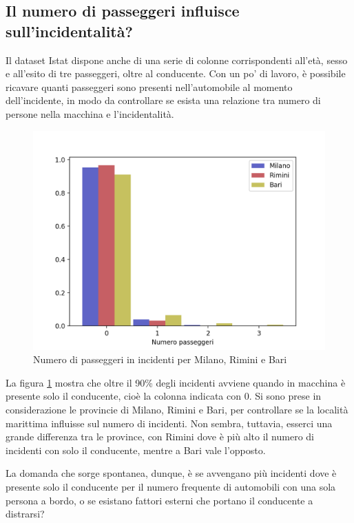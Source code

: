\documentclass[a4paper,12pt]{report}
\begin{document}
\subsection{Il numero di passeggeri influisce sull'incidentalità?}

Il dataset Istat dispone anche di una serie di colonne corrispondenti all'età, sesso e 
all'esito di tre passeggeri, oltre al conducente.
Con un po' di lavoro, è possibile ricavare quanti passeggeri sono presenti 
nell'automobile al momento dell'incidente, in modo da controllare se esista una 
relazione tra numero di persone nella macchina e l'incidentalità.

\begin{figure}
    \includegraphics[width=\linewidth]{../src/incidenti/incidenti_senza_coords/passeggeri/passeggeri.png}
    \caption{Numero di passeggeri in incidenti per Milano, Rimini e Bari}
    \label{fig:passeggeri-milano-rimini}
\end{figure}

La figura \ref{fig:passeggeri-milano-rimini} mostra che oltre il 90\% degli incidenti
avviene quando in macchina è presente solo il conducente, cioè la colonna indicata con 0.
Si sono prese in considerazione le provincie di Milano, Rimini e Bari, 
per controllare se la località marittima influisse sul numero di incidenti.
Non sembra, tuttavia, esserci una grande differenza tra le province, con Rimini dove è 
più alto il numero di incidenti con solo il conducente, mentre a Bari vale l'opposto.

La domanda che sorge spontanea, dunque, è se avvengano più incidenti dove è presente 
solo il conducente per il numero frequente di automobili con una sola persona a 
bordo, o se esistano fattori esterni che portano il conducente a distrarsi?
\end{document}

